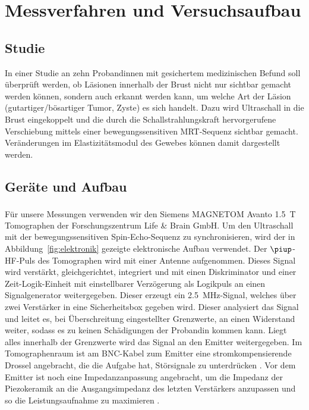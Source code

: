\documentclass[
    11pt,
    ngerman
]{scrbook}
\begin{document}
\chapter{Messverfahren und Versuchsaufbau}

\section{Studie}

In einer Studie an zehn Probandinnen mit gesichertem medizinischen Befund soll
überprüft werden, ob Läsionen innerhalb der Brust nicht nur sichtbar gemacht
werden können, sondern auch erkannt werden kann, um welche Art der Läsion
(gutartiger/bösartiger Tumor, Zyste) es sich handelt. Dazu wird Ultraschall in
die Brust eingekoppelt und die durch die Schallstrahlungskraft hervorgerufene
Verschiebung mittels einer bewegungssensitiven MRT-Sequenz sichtbar gemacht.
Veränderungen im Elastizitätsmodul des Gewebes können damit dargestellt werden.

\section{Geräte und Aufbau}

Für unsere Messungen verwenden wir den Siemens
\textsc{MAGNETOM}\textsuperscript{\textregistered} Avanto \SI{1.5}{\tesla}
Tomographen der Forschungszentrum Life \& Brain GmbH. Um den Ultraschall mit
der bewegungssensitiven Spin-Echo-Sequenz zu synchronisieren, wird der in
Abbildung~\ref{fig:elektronik} gezeigte elektronische Aufbau verwendet. Der
$\piup$-HF-Puls des Tomographen wird mit einer Antenne aufgenommen. Dieses
Signal wird verstärkt, gleichgerichtet, integriert und mit einen Diskriminator
und einer Zeit-Logik-Einheit mit einstellbarer Verzögerung als Logikpuls an
einen Signalgenerator weitergegeben. Dieser erzeugt ein
\SI{2.5}{\mega\hertz}-Signal, welches über zwei Verstärker in eine
Sicherheitsbox gegeben wird. Dieser analysiert das Signal und leitet es, bei
Überschreitung eingestellter Grenzwerte, an einen Widerstand weiter, sodass es
zu keinen Schädigungen der Probandin kommen kann. Liegt alles innerhalb der
Grenzwerte wird das Signal an den Emitter weitergegeben. Im Tomographenraum
ist am BNC-Kabel zum Emitter eine stromkompensierende Drossel angebracht, die
die Aufgabe hat, Störsignale zu unterdrücken \parencite{diss_radicke}. Vor dem
Emitter ist noch eine Impedanzanpassung angebracht, um die Impedanz der
Piezokeramik an die Ausgangsimpedanz des letzten Verstärkers anzupassen und so
die Leistungsaufnahme zu maximieren \parencite{dipl_kofahl}.
\end{document}
